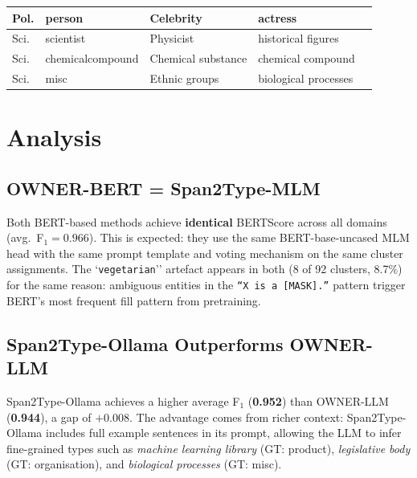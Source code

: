\documentclass[11pt,a4paper]{article}
\begin{document}
\begin{table}[h]
\begin{tabularx}{\textwidth}{l l X X X}
Pol. & person        & \textcolor{red!70!black}{Celebrity}                     & \textcolor{orange!70!black}{actress} \\
\midrule
Sci. & scientist     & \textcolor{green!60!black}{Physicist}                   & \textcolor{orange!70!black}{historical figures} \\
Sci. & chemicalcompound & \textcolor{green!60!black}{Chemical substance}       & \textcolor{green!60!black}{chemical compound} \\
Sci. & misc          & \textcolor{red!70!black}{Ethnic groups}                 & \textcolor{green!60!black}{biological processes} \\
\bottomrule
\end{tabularx}
\end{table}

\section{Analysis}

\subsection{OWNER-BERT = Span2Type-MLM}

Both BERT-based methods achieve \textbf{identical} BERTScore across all
domains (avg.\ F$_1 = 0.966$). This is expected: they use the same
BERT-base-uncased MLM head with the same prompt template and voting
mechanism on the same cluster assignments. The `\texttt{vegetarian}''
artefact appears in both (8 of 92 clusters, 8.7\%) for the same reason:
ambiguous entities in the \texttt{``X is a [MASK].''} pattern trigger
BERT's most frequent fill pattern from pretraining.

\subsection{Span2Type-Ollama Outperforms OWNER-LLM}

Span2Type-Ollama achieves a higher average F$_1$ (\textbf{0.952}) than
OWNER-LLM (\textbf{0.944}), a gap of $+0.008$. The advantage comes from
richer context: Span2Type-Ollama includes full example sentences in its
prompt, allowing the LLM to infer fine-grained types such as
\textit{machine learning library} (GT: product), \textit{legislative body}
(GT: organisation), and \textit{biological processes} (GT: misc).
\end{document}
